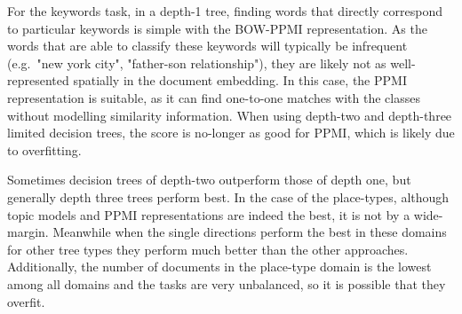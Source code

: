 For the keywords task,  in a depth-1 tree, finding words that  directly correspond to particular keywords is simple with the BOW-PPMI representation. As the words that are able to classify these keywords will typically be infrequent (e.g.\ "new york city", "father-son relationship"), they are likely not as well-represented spatially in the  document embedding. In this case, the PPMI representation is suitable, as it can find one-to-one matches with the classes without modelling similarity information. When using depth-two and depth-three limited decision trees, the score is no-longer as good for PPMI, which is likely  due to overfitting. 

Sometimes decision trees of depth-two outperform those of depth one, but generally depth three trees perform best.  In the case of the place-types, although topic models and PPMI representations are indeed the best, it is not by a wide-margin. Meanwhile when the single directions perform the best in these domains for other tree types they perform much better than the other approaches. Additionally, the number of documents in the place-type domain is the lowest among all domains and the tasks are very unbalanced, so it is possible that they overfit. 



